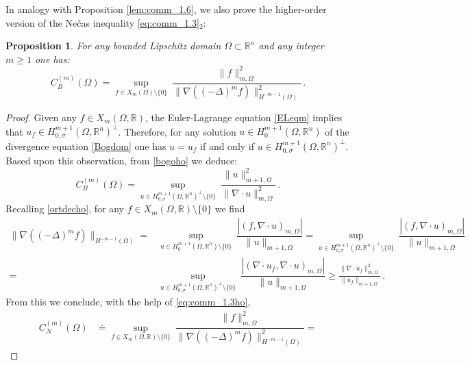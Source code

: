 \documentclass[11pt]{article}
\theoremstyle{plain}
\newtheorem{proposition}[theorem]{Proposition}
\theoremstyle{definition}
\numberwithin{equation}{section}
\newcommand{\R}{\mathbb{R}}
\begin{document}
In analogy with Proposition \ref{lem:comm_1.6}, we also prove the higher-order version of the Ne\v{c}as inequality \eqref{eq:comm_1.3}$_2$:

\begin{proposition}\label{lem:comm_1.6ho}
	For any bounded Lipschitz domain $\Omega \subset \R^n$ and any integer $m  \geq 1$ one has:
	\begin{equation}\label{eq:comm_1.13ho}
		C^{(m)}_{B}(\Omega) = \sup_ {f\in X_{m}(\Omega) \setminus \{0\}} \ \dfrac{\|f\|_{m,\Omega}^2}{\|\nabla ((-\Delta)^{m} f)\|_{H^{-m-1}(\Omega)}^2} \, .
	\end{equation}	
\end{proposition}
\noindent
\begin{proof}
	Given any $f\in  X_{m}(\Omega, \mathbb{R})$, the Euler-Lagrange equation \eqref{ELeqm} implies that $u_{f} \in H^{m+1}_{0,\sigma}(\Omega, \mathbb{R}^{n})^\perp$. Therefore, for any solution $u \in H^{m+1}_{0}(\Omega, \mathbb{R}^{n})$
	of the divergence equation \eqref{Bogdom} one has $u=u_f$ if and only if $u\in H^{m+1}_{0,\sigma}(\Omega, \mathbb{R}^{n})^\perp$.
	Based upon this observation, from \eqref{bogoho} we deduce:
	\begin{equation}\label{eq:comm_1.3ho}
		C^{(m)}_{B}(\Omega) = \sup_ {u \in H^{m+1}_{0,\sigma}(\Omega, \mathbb{R}^{n})^\perp \setminus \{0\}} \ \dfrac{\|u\|_{m+1,\Omega}^2}{\|\nabla \cdot u\|_{m,\Omega}^2} \, .
	\end{equation}	
Recalling \eqref{ortdecho}, for any $f\in X_{m}(\Omega, \mathbb{R}) \setminus \{0\}$ we find
	\begin{align*}
		\|\nabla ((-\Delta)^{m} f)\|_{H^{-m-1}(\Omega)}=&\sup_{u\in H^{m+1}_{0}(\Omega, \mathbb{R}^{n})\setminus \{0\}} \ \dfrac{ | (f, \nabla \cdot u)_{m, \Omega} |}{\| u\|_{m+1, \Omega}}
		=\sup_{u\in H^{m+1}_{0,\sigma}(\Omega, \mathbb{R}^{n})^\perp\setminus \{0\}} \ \dfrac{|(f, \nabla \cdot u)_{m, \Omega}|}{\| u\|_{m+1, \Omega}} \\[6pt]
		=& \sup_{u\in H^{m+1}_{0,\sigma}(\Omega, \mathbb{R}^{n})^\perp\setminus \{0\}} \ \dfrac{|(\nabla \cdot u_{f}, \nabla \cdot u)_{m, \Omega}|}{\| u\|_{m+1, \Omega}} \geq \frac{\|\nabla\cdot u_f\|^2_{m, \Omega}}{\| u_f\|_{m+1,\Omega}} \, .
	\end{align*}
	From this we conclude, with the help of \eqref{eq:comm_1.3ho},
	\begin{align*}
		C^{(m)}_{\mathcal{N}}(\Omega) & \doteq \sup_ {f\in X_{m}(\Omega, \mathbb{R}) \setminus \{0\}} \ \dfrac{\|f\|_{m,\Omega}^2}{\|\nabla ((-\Delta)^{m} f)\|_{H^{-m-1}(\Omega)}^2} =

\end{align*}
\end{proof}
\end{document}
